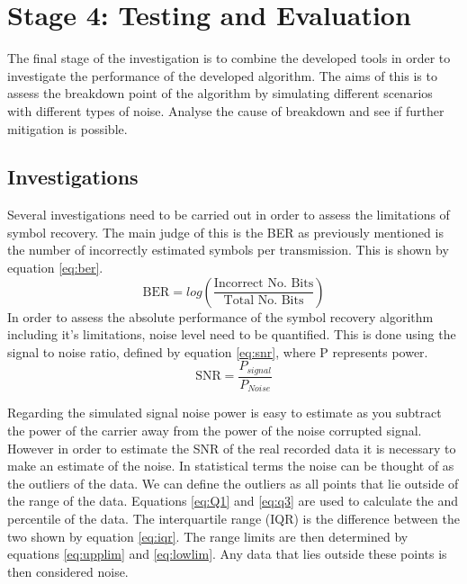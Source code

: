 \section{Stage 4: Testing and Evaluation}
The final stage of the investigation is to combine the developed tools in order to investigate the performance of the developed algorithm. The aims of this is to assess the breakdown point of the algorithm by simulating different scenarios with different types of noise. Analyse the cause of breakdown and see if further mitigation is possible.
\subsection{Investigations}
Several investigations need to be carried out in order to assess the limitations of symbol recovery. The main judge of this is the BER as previously mentioned is the number of incorrectly estimated symbols per transmission. This is shown by equation \ref{eq:ber}.
\begin{equation}
    \text{BER} = log\left(\frac{\text{Incorrect No. Bits}}{\text{Total No. Bits}}\right)
    \label{eq:ber}
\end{equation}
In order to assess the absolute performance of the symbol recovery algorithm including it's limitations, noise level need to be quantified. This is done using the signal to noise ratio, defined by equation \ref{eq:snr}, where P represents power.
\begin{subequations}
\begin{equation}
    \text{SNR} = \frac{P_{signal}}{P_{Noise}}
    \label{eq:snr}
\end{equation}
\end{subequations}

Regarding the simulated signal noise power is easy to estimate as you subtract the power of the carrier away from the power of the noise corrupted signal. However in order to estimate the SNR of the real recorded data it is necessary to make an estimate of the noise. In statistical terms the noise can be thought of as the outliers of the data. We can define the outliers as all points that lie outside of the range of the data. Equations \ref{eq:Q1} and \ref{eq:q3} are used to calculate the  and  percentile of the data. The interquartile range (IQR) is the difference between the two shown by equation \ref{eq:iqr}. The range limits are then determined by equations \ref{eq:upplim} and \ref{eq:lowlim}. Any data that lies outside these points is then considered noise.

